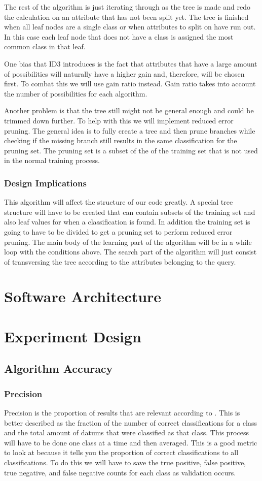 \documentclass{article}
\begin{document}
				The rest of the algorithm is just iterating through as the tree is made and redo the calculation on an attribute that has not been split yet. The tree is finished when all leaf nodes are a single class or when attributes to split on have run out. In this case each leaf node that does not have a class is assigned the most common class in that leaf.
				
				One bias that ID3 introduces is the fact that attributes that have a large amount of possibilities will naturally have a higher gain and, therefore, will be chosen first. To combat this we will use gain ratio instead. Gain ratio takes into account the number of possibilities for each algorithm.
				
				Another problem is that the tree still might not be general enough and could be trimmed down further. To help with this we will implement reduced error pruning. The general idea is to fully create a tree and then prune branches while checking if the missing branch still results in the same classification for the pruning set. The pruning set is a subset of the of the training set that is not used in the normal training process.
			\subsubsection{Design Implications}
				This algorithm will affect the structure of our code greatly. A special tree structure will have to be created that can contain subsets of the training set and also leaf values for when a classification is found. In addition the training set is going to have to be divided to get a pruning set to perform reduced error pruning. The main body of the learning part of the algorithm will be in a while loop with the conditions above. The search part of the algorithm will just consist of transversing the tree according to the attributes belonging to the query.
		
	\section{Software Architecture}
	\section{Experiment Design}
		\subsection{Algorithm Accuracy}
			\subsubsection{Precision}
			Precision is the proportion of results that are relevant according to \cite{ai}. This is better described as the fraction of the number of correct classifications for a class and the total amount of datums that were classified as that class. This process will have to be done one class at a time and then averaged.
			This is a good metric to look at because it tells you the proportion of correct classifications to all classifications. To do this we will have to save the true positive, false positive, true negative, and false negative counts for each class as validation occurs.
\end{document}

